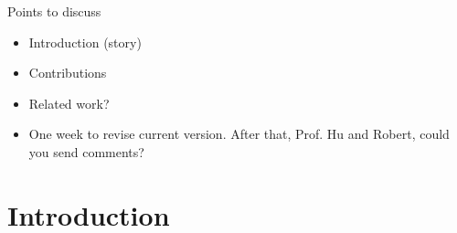 \documentclass[runningheads]{llncs}
\begin{document}
Points to discuss
\begin{itemize}
\item Introduction (story)
\item Contributions
\item Related work?
\item One week to revise current version.
  After that, Prof. Hu and Robert, could you send comments?

\end{itemize}

\section{Introduction}

\end{document}
